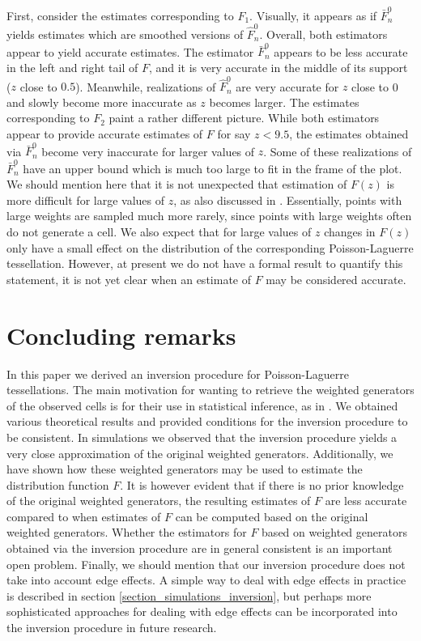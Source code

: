 \documentclass{article}
\theoremstyle{plain}
\theoremstyle{remark}
\theoremstyle{definition}
\begin{document}
First, consider the estimates corresponding to $F_1$. Visually, it appears as if $\bar{F}_n^0$ yields estimates which are smoothed versions of $\hat{F}_n^0$. Overall, both estimators appear to yield accurate estimates. The estimator $\bar{F}_n^0$ appears to be less accurate in the left and right tail of $F$, and it is very accurate in the middle of its support ($z$ close to $0.5$). Meanwhile, realizations of $\hat{F}_n^0$ are very accurate for $z$ close to 0 and slowly become more inaccurate as $z$ becomes larger. The estimates corresponding to $F_2$ paint a rather different picture. While both estimators appear to provide accurate estimates of $F$ for say $z < 9.5$, the estimates obtained via $\bar{F}_n^0$ become very inaccurate for larger values of $z$. Some of these realizations of $\bar{F}_n^0$ have an upper bound which is much too large to fit in the frame of the plot. We should mention here that it is not unexpected that estimation of $F(z)$ is more difficult for large values of $z$, as also discussed in \cite{vdjagt2025b}. Essentially, points with large weights are sampled much more rarely, since points with large weights often do not generate a cell. We also expect that for large values of $z$ changes in $F(z)$ only have a small effect on the distribution of the corresponding Poisson-Laguerre tessellation. However, at present we do not have a formal result to quantify this statement, it is not yet clear when an estimate of $F$ may be considered accurate.

\section{Concluding remarks}\label{section_discussion_inversion}
In this paper we derived an inversion procedure for Poisson-Laguerre tessellations. The main motivation for wanting to retrieve the weighted generators of the observed cells is for their use in statistical inference, as in \cite{vdjagt2025b}. We obtained various theoretical results and provided conditions for the inversion procedure to be consistent. In simulations we observed that the inversion procedure yields a very close approximation of the original weighted generators. Additionally, we have shown how these weighted generators may be used to estimate the distribution function $F$. It is however evident that if there is no prior knowledge of the original weighted generators, the resulting estimates of $F$ are less accurate compared to when estimates of $F$ can be computed based on the original weighted generators. Whether the estimators for $F$ based on weighted generators obtained via the inversion procedure are in general consistent is an important open problem. Finally, we should mention that our inversion procedure does not take into account edge effects. A simple way to deal with edge effects in practice is described in section \ref{section_simulations_inversion}, but perhaps more sophisticated approaches for dealing with edge effects can be incorporated into the inversion procedure in future research.
\end{document}
